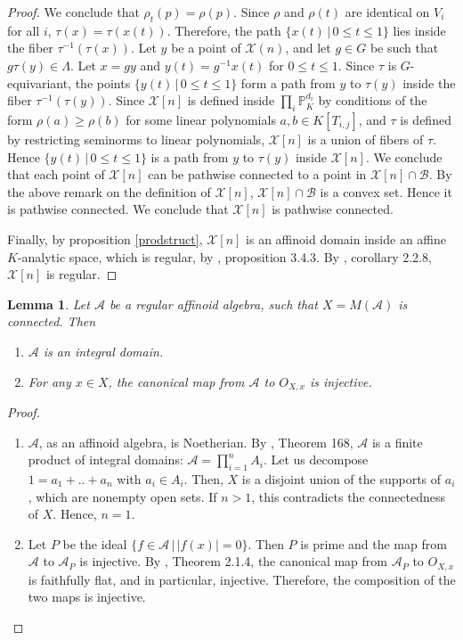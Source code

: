\documentclass{amsart}
\theoremstyle{theorem}
\theoremstyle{lemma}
\newtheorem{lemma}{Lemma}[section]
\theoremstyle{prop}
\theoremstyle{definition}
\theoremstyle{corollary}
\theoremstyle{remark}
\newcommand{\AF}{\mathcal{A}}
\newcommand{\B}{\mathcal{B}}
\newcommand{\X}{\mathcal{X}}
\newcommand{\PR}{\mathbb{P}}
\begin{document}
\begin{proof}
We conclude that $\rho_t(p)=\rho(p)$. Since $\rho$ and $\rho(t)$ are identical on $V_i$ for all $i$, $\tau(x)=\tau(x(t))$.   
Therefore, the path $\{x(t) \, | \, 0\leq t \leq 1 \}$ lies inside the fiber $\tau^{-1}(\tau(x))$. 
Let $y$ be a point of $\X(n)$, and let $g\in G$ be such that $g \tau(y) \in \Lambda$. Let $x=gy$ and $y(t)=g^{-1}x(t)$ for $0\leq t \leq 1$. Since $\tau$ is $G$-equivariant, the points $\{y(t) \, | \, 0\leq t \leq 1 \}$ form a path from $y$ to $\tau(y)$ inside the fiber $\tau^{-1}(\tau(y))$. 
Since $\X[n]$ is defined inside $\prod_i \PR^{d_i}_K$ by conditions of the form $\rho(a)\geq\rho(b)$ for some linear polynomials $a,b \in K[T_{i,j}]$, and $\tau$ is defined by restricting seminorms to linear polynomials, $\X[n]$ is a union of fibers of $\tau$. Hence $\{ y(t) \,| \, 0 \leq t \leq 1\}$ is a path from $y$ to $\tau(y)$ inside $\X[n]$. We conclude that each point of $\X[n]$ can be pathwise connected to a point in $\X[n] \cap \B$. By the above remark on the definition of $\X[n]$,  $\X[n] \cap \B$ is a convex set. Hence it is pathwise connected. We conclude that $\X[n]$ is pathwise connected.

Finally, by proposition \ref{prodstruct}, $\X[n]$ is an affinoid domain inside an affine $K$-analytic space, which is regular, by \cite{ber2}, proposition 3.4.3. By \cite{ber4}, corollary 2.2.8, $\X[n]$ is regular.
\end{proof}

\begin{lemma} \label{inject}
Let $\AF$ be a regular affinoid algebra, such that $X=M(\AF)$ is connected. Then \begin{enumerate}
\item $\AF$ is an integral domain.
\item For any $x \in X$, the canonical map from $\AF$ to $O_{X,x}$ is injective. 
\end{enumerate}
\end{lemma}

\begin{proof}
\begin{enumerate}
\item
$\AF$, as an affinoid algebra, is Noetherian. By \cite{kap}, Theorem 168, $\AF$ is a finite product of integral domains: $\AF=\prod_{i=1}^n A_i$. Let us decompose $1=a_1+..+a_n$ with $a_i \in A_i$. Then, $X$ is a disjoint union of the supports of $a_i$, which are nonempty open sets. If $n>1$, this contradicts the connectedness of $X$. Hence, $n=1$.
\item
Let $P$ be the ideal $\{f\in \AF\,|\, |f(x)|=0\}$. Then $P$ is prime and the map from $\AF$ to $\AF_P$ is injective. By \cite{ber4}, Theorem 2.1.4, the canonical map from $\AF_P$ to $O_{X,x}$ is faithfully flat, and in particular, injective. Therefore, the composition of the two maps is injective. \qedhere
\end{enumerate}
\end{proof}
\end{document}
